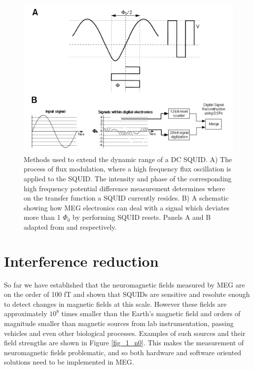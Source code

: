 \begin{figure}
	\begin{center}
		\includegraphics[width=\linewidth]{./images/chapter1/figure_s3.png}\caption{Methods used to extend the dynamic range of a DC SQUID. A) The process of flux modulation, where a high frequency flux oscillation is applied to the SQUID. The intensity and phase of the corresponding high frequency potential difference measurement determines where on the transfer function a SQUID currently resides. B) A schematic showing how MEG electronics can deal with a signal which deviates more than 1 $\Phi_0$ by performing SQUID resets. Panels A and B adapted from \cite{Hamalainen1993} and \cite{Vrba1999} respectively.}\label{fig_1_s3}
	\end{center}
\end{figure}

\clearpage

\section{Interference reduction}\label{sec_1_inteference}
So far we have established that the neuromagnetic fields measured by MEG are on the order of 100 fT and shown that SQUIDs are sensitive and resolute enough to detect changes in magnetic fields at this scale. However these fields are approximately $10^{8}$ times smaller than the Earth's magnetic field and  orders of magnitude smaller than magnetic sources from lab instrumentation, passing vehicles and even other biological processes. Examples of such sources and their field strengths are shown in Figure \ref{fig_1_n0}. This makes the measurement of neuromagnetic fields problematic, and so both hardware and software oriented solutions need to be implemented in MEG.

